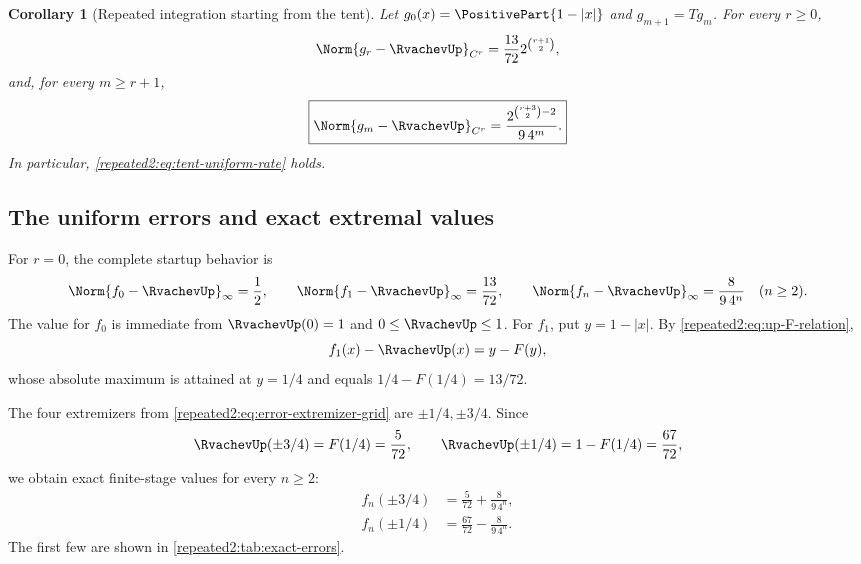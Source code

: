 \documentclass[11pt,oneside]{article}
\newtheorem{corollary}[corollary]{Corollary}
\theoremstyle{definition}
\theoremstyle{remark}
\begin{document}
\begin{corollary}[Repeated integration starting from the tent]
\label{repeated2:cor:tent-indexed-rate}
Let $g_0(x)=\PositivePart{1-|x|}$ and $g_{m+1}=Tg_m$.  For every $r\ge0$,
\begin{equation}
 \Norm{g_r-\RvachevUp}_{C^r}
 =\frac{13}{72}2^{\binom{r+1}{2}},
 \label{repeated2:eq:tent-first-Cr}
\end{equation}
and, for every $m\ge r+1$,
\begin{equation}
 \boxed{\displaystyle
 \Norm{g_m-\RvachevUp}_{C^r}
 =\frac{2^{\binom{r+3}{2}-2}}{9\,4^m}.}
 \label{repeated2:eq:tent-Cr-rate}
\end{equation}
In particular, \eqref{repeated2:eq:tent-uniform-rate} holds.
\end{corollary}

\subsection{The uniform errors and exact extremal values}

For $r=0$, the complete startup behavior is
\begin{equation}
 \Norm{f_0-\RvachevUp}_\infty=\frac12,
 \qquad
 \Norm{f_1-\RvachevUp}_\infty=\frac{13}{72},
 \qquad
 \Norm{f_n-\RvachevUp}_\infty=\frac{8}{9\,4^n}\quad(n\ge2).
 \label{repeated2:eq:all-uniform-errors}
\end{equation}
The value for $f_0$ is immediate from $\RvachevUp(0)=1$ and $0\le\RvachevUp\le1$.  For $f_1$, put
$y=1-|x|$.  By \eqref{repeated2:eq:up-F-relation},
\begin{equation}
 f_1(x)-\RvachevUp(x)=y-F(y),
 \label{repeated2:eq:f1-error-F}
\end{equation}
whose absolute maximum is attained at $y=1/4$ and equals
$1/4-F(1/4)=13/72$.

The four extremizers from \eqref{repeated2:eq:error-extremizer-grid} are
$\pm1/4,\pm3/4$.  Since
\begin{equation}
 \RvachevUp(\pm3/4)=F(1/4)=\frac5{72},
 \qquad
 \RvachevUp(\pm1/4)=1-F(1/4)=\frac{67}{72},
 \label{repeated2:eq:up-quarter-values}
\end{equation}
we obtain exact finite-stage values for every $n\ge2$:
\begin{align}
 f_n(\pm3/4)&=\frac5{72}+\frac{8}{9\,4^n},
 \label{repeated2:eq:fn-threequarter}\\
 f_n(\pm1/4)&=\frac{67}{72}-\frac{8}{9\,4^n}.
 \label{repeated2:eq:fn-onequarter}
\end{align}
The first few are shown in \cref{repeated2:tab:exact-errors}.
\end{document}
